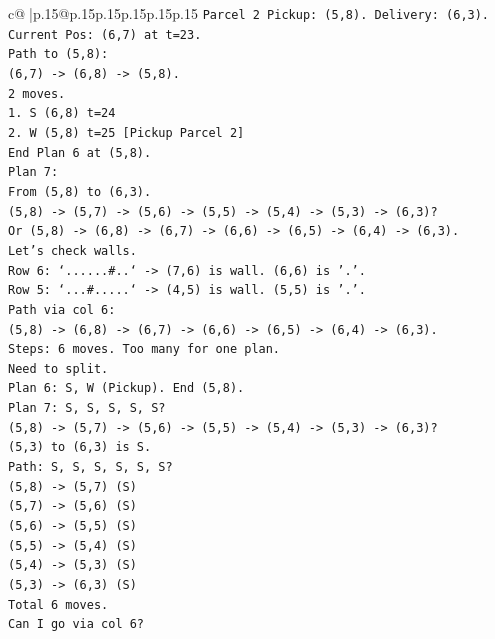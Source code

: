 \documentclass{article}
\begin{document}
{\begin{supertabular}{c@{$\;$}|p{.15\linewidth}@{}p{.15\linewidth}p{.15\linewidth}p{.15\linewidth}p{.15\linewidth}p{.15\linewidth}}
{{{\texttt{Parcel 2 Pickup: (5,8). Delivery: (6,3).} \\
\texttt{Current Pos: (6,7) at t=23.} \\
\texttt{Path to (5,8):} \\
\texttt{(6,7) {-}> (6,8) {-}> (5,8).} \\
\texttt{2 moves.} \\
\texttt{1. S (6,8) t=24} \\
\texttt{2. W (5,8) t=25 {[}Pickup Parcel 2{]}} \\
\texttt{End Plan 6 at (5,8).} \\
\texttt{Plan 7:} \\
\texttt{From (5,8) to (6,3).} \\
\texttt{(5,8) {-}> (5,7) {-}> (5,6) {-}> (5,5) {-}> (5,4) {-}> (5,3) {-}> (6,3)?} \\
\texttt{Or (5,8) {-}> (6,8) {-}> (6,7) {-}> (6,6) {-}> (6,5) {-}> (6,4) {-}> (6,3).} \\
\texttt{Let's check walls.} \\
\texttt{Row 6: `......\#..` {-}> (7,6) is wall. (6,6) is '.'.} \\
\texttt{Row 5: `...\#.....` {-}> (4,5) is wall. (5,5) is '.'.} \\
\texttt{Path via col 6:} \\
\texttt{(5,8) {-}> (6,8) {-}> (6,7) {-}> (6,6) {-}> (6,5) {-}> (6,4) {-}> (6,3).} \\
\texttt{Steps: 6 moves. Too many for one plan.} \\
\texttt{Need to split.} \\
\texttt{Plan 6: S, W (Pickup). End (5,8).} \\
\texttt{Plan 7: S, S, S, S, S?} \\
\texttt{(5,8) {-}> (5,7) {-}> (5,6) {-}> (5,5) {-}> (5,4) {-}> (5,3) {-}> (6,3)?} \\
\texttt{(5,3) to (6,3) is S.} \\
\texttt{Path: S, S, S, S, S, S?} \\
\texttt{(5,8) {-}> (5,7) (S)} \\
\texttt{(5,7) {-}> (5,6) (S)} \\
\texttt{(5,6) {-}> (5,5) (S)} \\
\texttt{(5,5) {-}> (5,4) (S)} \\
\texttt{(5,4) {-}> (5,3) (S)} \\
\texttt{(5,3) {-}> (6,3) (S)} \\
\texttt{Total 6 moves.} \\
\texttt{Can I go via col 6?} \\
}}}
\end{supertabular}}
\end{document}
